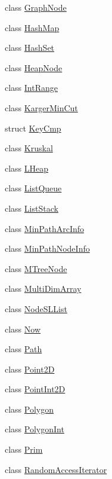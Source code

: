 \begin{DoxyCompactItemize}
class \hyperlink{class_designar_1_1_graph_node}{Graph\+Node}
\item 
class \hyperlink{class_designar_1_1_hash_map}{Hash\+Map}
\item 
class \hyperlink{class_designar_1_1_hash_set}{Hash\+Set}
\item 
class \hyperlink{class_designar_1_1_heap_node}{Heap\+Node}
\item 
class \hyperlink{class_designar_1_1_int_range}{Int\+Range}
\item 
class \hyperlink{class_designar_1_1_karger_min_cut}{Karger\+Min\+Cut}
\item 
struct \hyperlink{struct_designar_1_1_key_cmp}{Key\+Cmp}
\item 
class \hyperlink{class_designar_1_1_kruskal}{Kruskal}
\item 
class \hyperlink{class_designar_1_1_l_heap}{L\+Heap}
\item 
class \hyperlink{class_designar_1_1_list_queue}{List\+Queue}
\item 
class \hyperlink{class_designar_1_1_list_stack}{List\+Stack}
\item 
class \hyperlink{class_designar_1_1_min_path_arc_info}{Min\+Path\+Arc\+Info}
\item 
class \hyperlink{class_designar_1_1_min_path_node_info}{Min\+Path\+Node\+Info}
\item 
class \hyperlink{class_designar_1_1_m_tree_node}{M\+Tree\+Node}
\item 
class \hyperlink{class_designar_1_1_multi_dim_array}{Multi\+Dim\+Array}
\item 
class \hyperlink{class_designar_1_1_node_s_l_list}{Node\+S\+L\+List}
\item 
class \hyperlink{class_designar_1_1_now}{Now}
\item 
class \hyperlink{class_designar_1_1_path}{Path}
\item 
class \hyperlink{class_designar_1_1_point2_d}{Point2D}
\item 
class \hyperlink{class_designar_1_1_point_int2_d}{Point\+Int2D}
\item 
class \hyperlink{class_designar_1_1_polygon}{Polygon}
\item 
class \hyperlink{class_designar_1_1_polygon_int}{Polygon\+Int}
\item 
class \hyperlink{class_designar_1_1_prim}{Prim}
\item 
class \hyperlink{class_designar_1_1_random_access_iterator}{Random\+Access\+Iterator}
\item 

\end{DoxyCompactItemize}
